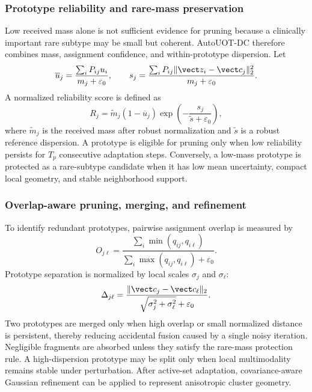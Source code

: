 \subsubsection{Prototype reliability and rare-mass preservation}
Low received mass alone is not sufficient evidence for pruning because a clinically important rare subtype may be small but coherent. AutoUOT-DC therefore combines mass, assignment confidence, and within-prototype dispersion. Let
\begin{equation}
 \overline u_j=
 \frac{\sum_iP_{ij}u_i}{m_j+\varepsilon_0},
 \qquad
 s_j=\frac{\sum_iP_{ij}\|\vect z_i-\vect c_j\|_2^2}
 {m_j+\varepsilon_0}.
\label{eq:prototype_stats}
\end{equation}
A normalized reliability score is defined as
\begin{equation}
 R_j=\widetilde m_j(1-\overline u_j)
 \exp\!\left(-\frac{s_j}{\widetilde s+\varepsilon_0}\right),
\label{eq:prototype_reliability}
\end{equation}
where $\widetilde m_j$ is the received mass after robust normalization and $\widetilde s$ is a robust reference dispersion. A prototype is eligible for pruning only when low reliability persists for $T_p$ consecutive adaptation steps. Conversely, a low-mass prototype is protected as a rare-subtype candidate when it has low mean uncertainty, compact local geometry, and stable neighborhood support.

\subsubsection{Overlap-aware pruning, merging, and refinement}
To identify redundant prototypes, pairwise assignment overlap is measured by
\begin{equation}
 O_{j\ell}=
 \frac{\sum_i\min(q_{ij},q_{i\ell})}
 {\sum_i\max(q_{ij},q_{i\ell})+\varepsilon_0}.
\label{eq:overlap}
\end{equation}
Prototype separation is normalized by local scales $\sigma_j$ and $\sigma_{\ell}$:
\begin{equation}
 \Delta_{j\ell}=\frac{\|\vect c_j-\vect c_{\ell}\|_2}
 {\sqrt{\sigma_j^2+\sigma_{\ell}^2}+\varepsilon_0}.
\label{eq:scaled_distance}
\end{equation}
Two prototypes are merged only when high overlap or small normalized distance is persistent, thereby reducing accidental fusion caused by a single noisy iteration. Negligible fragments are absorbed unless they satisfy the rare-mass protection rule. A high-dispersion prototype may be split only when local multimodality remains stable under perturbation. After active-set adaptation, covariance-aware Gaussian refinement can be applied to represent anisotropic cluster geometry.

